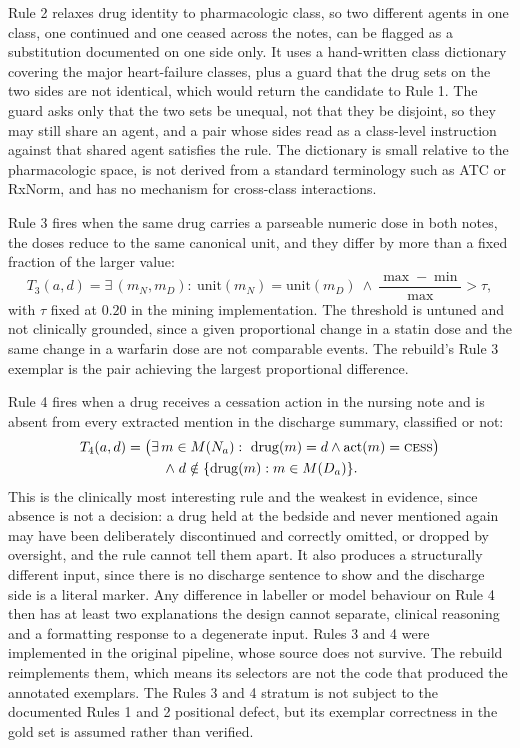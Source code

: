 Rule 2 relaxes drug identity to pharmacologic class, so two different agents in one class, one
continued and one ceased across the notes, can be flagged as a substitution documented on one side
only. It uses a hand-written class dictionary covering the major heart-failure classes, plus a guard
that the drug sets on the two sides are not identical, which would return the candidate to Rule 1.
The guard asks only that the two sets be unequal, not that they be disjoint, so they may still
share an agent, and a pair whose sides read as a class-level instruction against that shared agent
satisfies the rule.
The dictionary is small relative to the pharmacologic space, is not derived from a standard
terminology such as ATC or RxNorm, and has no mechanism for cross-class interactions.

Rule 3 fires when the same drug carries a parseable numeric dose in both notes, the doses reduce to
the same canonical unit, and they differ by more than a fixed fraction of the larger value:
\[
T_3(a,d) = \exists\,(m_N, m_D):\
\mathrm{unit}(m_N) = \mathrm{unit}(m_D)\ \wedge\
\frac{\max - \min}{\max} > \tau ,
\]
with $\tau$ fixed at $0.20$ in the mining implementation. The threshold is untuned and not clinically grounded, since a given
proportional change in a statin dose and the same change in a warfarin dose are not comparable
events. The rebuild's Rule 3 exemplar is the pair achieving the largest proportional difference.

Rule 4 fires when a drug receives a cessation action in the nursing note and is absent from every
extracted mention in the discharge summary, classified or not:
\begin{multline*}
T_4(a,d) =
\bigl(\exists\, m \in M(N_a):\ \mathrm{drug}(m) = d \wedge \mathrm{act}(m) = \textsc{cess}\bigr) \\
\;\wedge\;
d \notin \{\mathrm{drug}(m) : m \in M(D_a)\}.
\end{multline*}
This is the clinically most interesting rule and the weakest in evidence, since absence is not a
decision: a drug held at the bedside and never mentioned again may have been deliberately
discontinued and correctly omitted, or dropped by oversight, and the rule cannot tell them apart. It
also produces a structurally different input, since there is no discharge sentence to show and the
discharge side is a literal marker. Any difference in labeller or model behaviour on Rule 4 then has
at least two explanations the design cannot separate, clinical reasoning and a formatting response to
a degenerate input. Rules 3 and 4 were implemented in the original pipeline, whose source does not
survive. The rebuild reimplements them, which means its selectors are not the code that produced the
annotated exemplars. The Rules 3 and 4 stratum is not subject to the documented Rules 1 and 2
positional defect, but its exemplar correctness in the gold set is assumed rather than verified.

